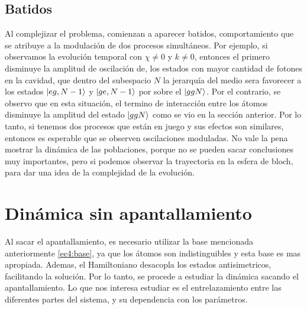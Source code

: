 \subsection{Batidos}

Al complejizar el problema, comienzan a aparecer batidos, comportamiento que se atribuye a la modulación de dos procesos simultáneos. Por ejemplo, si observamos la evolución temporal con $\chi\neq0$ y $k\neq0$, entonces el primero disminuye la amplitud de oscilación de, los estados con mayor cantidad de fotones en la cavidad, que dentro del subespacio $N$ la jerarquía del medio sera favorecer a los estados $\ket{eg,N-1}$ y $\ket{ge,N-1}$ por sobre el $\ket{ggN}$. Por el contrario, se observo que en esta situación, el termino de interacción entre los átomos disminuye la amplitud del estado $\ket{ggN}$ como se vio en la sección anterior. Por lo tanto, si tenemos dos procesos que están en juego y sus efectos son similares, entonces es esperable que se observen oscilaciones moduladas. No vale la pena mostrar la dinámica de las poblaciones, porque no se pueden sacar conclusiones muy importantes, pero si podemos observar la trayectoria en la esfera de bloch, para dar una idea de la complejidad de la evolución.

\section{Dinámica sin apantallamiento}
\label{sec4:dinamica sin apantallamiento}

Al sacar el apantallamiento, es necesario utilizar la base mencionada anteriormente \ref{ec4:base}, ya que los átomos son indistinguibles y esta base es mas apropiada. Ademas, el Hamiltoniano desacopla los estados antisimetricos, facilitando la solución. Por lo tanto, se procede a estudiar la dinámica sacando el apantallamiento. Lo que nos interesa estudiar es el entrelazamiento entre las diferentes partes del sistema, y su dependencia con los parámetros. 

